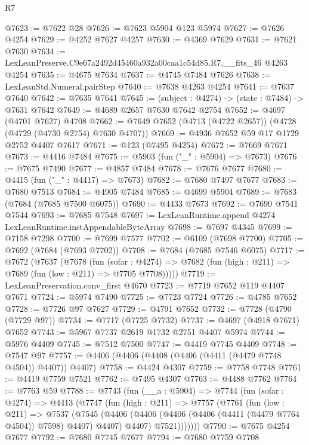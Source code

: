 \begin{lexlean}{R7}
\begin{coremodule}
@7623 := @7622 @28
@7626 := @7623 @5904 @123 @5974
@7627 := @7626 @4254
@7629 := @4252 @7627 @4257
@7630 := @4369 @7629
@7631 := @7621 @7630
@7634 := LexLeanPreserve.C9e67a2492d45460a932a00caa1c54d85.R7.__fits_46 @4263 @4254
@7635 := @4675 @7634
@7637 := @4745 @7484 @7626
@7638 := LexLeanStd.Numeral.pairStep
@7640 := @7638 @4263 @4254
@7641 := @7637 @7640
@7642 := @7635 @7641
@7645 := (subject : @4274) -> (state : @7484) -> @7631 @7642
@7649 := @4689 @2657 @7630 @7642 @2754
@7652 := @4697 (@4701 @7627) @4708
@7662 := @7649 @7652 (@4713 (@4722 @2657)) (@4728 (@4729 (@4730 @2754) @7630 @4707))
@7669 := @4936 @7652 @59 @17 @1729 @2752 @4407 @7617
@7671 := @123 (@7495 @4254)
@7672 := @7669 @7671
@7673 := @4416 @7484
@7675 := @5903 (fun ("_" : @5904) => @7673)
@7676 := @7675 @7490
@7677 := @4857 @7484
@7678 := @7676 @7677
@7680 := @4415 (fun ("_" : @4417) => @7673)
@7682 := @7680 @7497 @7677
@7683 := @7680 @7513
@7684 := @4905 @7484
@7685 := @4699 @5904
@7689 := @7683 (@7684 (@7685 @7500 @6075))
@7690 := @4433 @7673
@7692 := @7690 @7541 @7544
@7693 := @7685 @7548
@7697 := LexLeanRuntime.append @4274 LexLeanRuntime.instAppendableByteArray
@7698 := @7697 @4345
@7699 := @7158 @7298
@7700 := @7699 @7577
@7702 := @6109 (@7698 @7700)
@7705 := @7692 (@7684 (@7693 @7702))
@7708 := @7684 (@7685 @7546 @6075)
@7717 := @7672
    (@7637
      (@7678
        (fun (sofar : @4274) =>
        @7682 (fun (high : @211) => @7689 (fun (low : @211) => @7705 @7708)))))
@7719 := LexLeanPreservation.conv_first @4670
@7723 := @7719 @7652 @119 @4407 @7671
@7724 := @5974 @7490
@7725 := @7723 @7724
@7726 := @4785 @7652
@7728 := @7726 @97 @7627
@7729 := @4791 @7652
@7732 := @7728 (@4790 (@7729 @97))
@7734 := @7717 (@7725 @7732)
@7737 := @4697 (@4918 @7671) @7652
@7743 := @5967 @7737 @2619 @1732 @2751 @4407 @5974
@7744 := @5976 @4409
@7745 := @7512 @7500
@7747 := @4419 @7745 @4409
@7748 := @7547 @97
@7757 := @4406 (@4406 (@4408 (@4406 (@4411 (@4479 @7748 @4504)) @4407)) @4407)
@7758 := @4424 @4307
@7759 := @7758 @7748
@7761 := @4419 @7759 @7521
@7762 := @7495 @4307
@7763 := @4488 @7762
@7764 := @7763 @59
@7788 := @7743
    (fun (__a : @5904) =>
    @7744
      (fun (sofar : @4274) =>
      @4413
        (@7747
          (fun (high : @211) =>
          @7757
            (@7761
              (fun (low : @211) =>
              @7537
                (@7545
                  (@4406
                    (@4406 (@4406 (@4406 (@4411 (@4479 @7764 @4504)) @7598) @4407) @4407)
                    @4407)
                  @7521)))))))
@7790 := @7675 @4254 @7677
@7792 := @7680 @7745 @7677
@7794 := @7680 @7759 @7708

\end{coremodule}
\end{lexlean}
